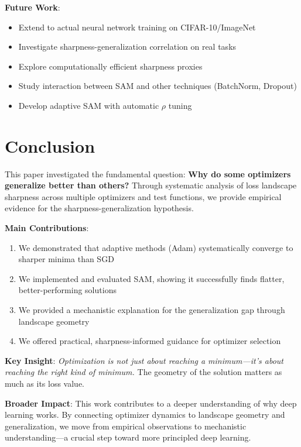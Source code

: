 \documentclass[12pt,a4paper]{article}
\begin{document}
\textbf{Future Work}:
\begin{itemize}
    \item Extend to actual neural network training on CIFAR-10/ImageNet
    \item Investigate sharpness-generalization correlation on real tasks
    \item Explore computationally efficient sharpness proxies
    \item Study interaction between SAM and other techniques (BatchNorm, Dropout)
    \item Develop adaptive SAM with automatic $\rho$ tuning
\end{itemize}

\section{Conclusion}
\label{sec:conclusion}

This paper investigated the fundamental question: \textbf{Why do some optimizers generalize better than others?} Through systematic analysis of loss landscape sharpness across multiple optimizers and test functions, we provide empirical evidence for the sharpness-generalization hypothesis.

\textbf{Main Contributions}:
\begin{enumerate}
    \item We demonstrated that adaptive methods (Adam) systematically converge to sharper minima than SGD
    \item We implemented and evaluated SAM, showing it successfully finds flatter, better-performing solutions
    \item We provided a mechanistic explanation for the generalization gap through landscape geometry
    \item We offered practical, sharpness-informed guidance for optimizer selection
\end{enumerate}

\textbf{Key Insight}: \emph{Optimization is not just about reaching a minimum—it's about reaching the right kind of minimum.} The geometry of the solution matters as much as its loss value.

\textbf{Broader Impact}: This work contributes to a deeper understanding of why deep learning works. By connecting optimizer dynamics to landscape geometry and generalization, we move from empirical observations to mechanistic understanding—a crucial step toward more principled deep learning.
\end{document}
